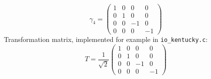 \documentclass[11pt,a4paper]{article}
\newcommand{\ROOT}[0]{/Users/atlytle/Dropbox/Tex_docs}
\begin{document}
\begin{equation}
\gamma_4 =
\begin{pmatrix}
 1 & 0 & 0 & 0 \\
 0 & 1 & 0 & 0 \\
 0 & 0 & -1 & 0 \\
 0 & 0 & 0 & -1
\end{pmatrix}
\end{equation}
Transformation matrix, implemented for example in {\tt io\_kentucky.c}:
\begin{equation}
T = \frac{1}{\sqrt{2}}
\begin{pmatrix}
 1 & 0 & 0 & 0 \\
 0 & 1 & 0 & 0 \\
 0 & 0 & -1 & 0 \\
 0 & 0 & 0 & -1
\end{pmatrix}
\end{equation}
 




\end{document}

